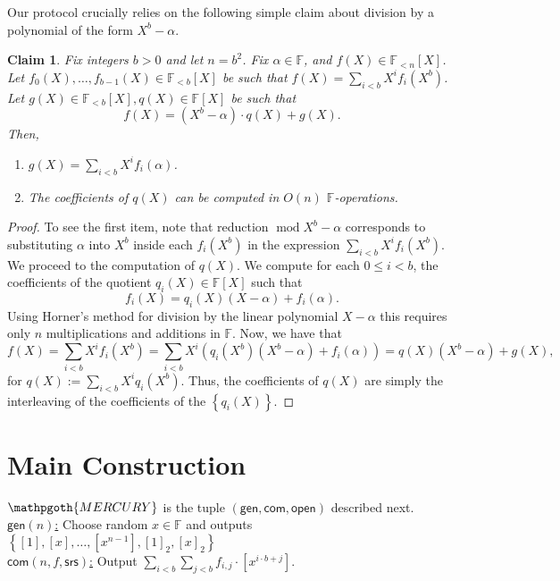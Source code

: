 \documentclass[11pt]{article} %
\newcommand{\mercury}{\ensuremath{\mathpgoth{MERCURY} }\xspace}
\newcommand{\F}{\ensuremath{\mathbb F}\xspace}
\newcommand{\srs}{\ensuremath{\mathsf{srs}}\xspace}
\newcommand{\com}{\ensuremath{\mathsf{com}}\xspace}
\newcommand{\open}{\ensuremath{\mathsf{open}}\xspace}
\newcommand{\defeq}{:=}
\renewcommand{\mod}{\ensuremath{\;\mathrm{mod}\;}}
\newcommand{\enc}[1]{\ensuremath{\left[#1\right]}\xspace}
\newcommand{\enctwo}[1]{\ensuremath{\left[#1\right]_2}\xspace}
\newcommand{\gen}{\ensuremath{\mathsf{gen}}\xspace}
\newcommand{\set}[1]{\ensuremath{\left\{#1\right\}}\xspace}
\newcommand{\polysofdeg}[1]{\ensuremath{\F_{< #1}[X]}\xspace}
\newcommand{\polys}{\ensuremath{\F[X]}\xspace}
\newcommand{\sumi}[1]{\sum_{i< #1}}
\newcommand{\sumj}[1]{\sum_{j< #1}}
\newtheorem{claim}[lemma]{Claim}
\begin{document}
Our protocol crucially relies on the following simple claim about division by a polynomial of the form
$X^b-\alpha$.
\begin{claim}\label{clm:univariatemod}
 Fix integers $b>0$ and let $n=b^2$. Fix $\alpha\in \F$, and $f(X)\in \polysofdeg{n}$.
Let $f_0(X),\ldots,f_{b-1}(X)\in \polysofdeg{b}$ be such that
$f(X)=\sumi{b}X^i f_i(X^b)$.
 Let $g(X)\in \polysofdeg{b},q(X)\in \polys$ be such that 
 \[f(X)=(X^b-\alpha)\cdot q(X) + g(X).\]
 Then,
 \begin{enumerate}
  \item $g(X)=\sumi{b} X^i f_i(\alpha)$.
  \item The coefficients of $q(X)$ can be computed in $O(n)$ \F-operations.
 \end{enumerate}

\end{claim}
\begin{proof}
To see the first item, note that reduction $\mod X^b-\alpha$ corresponds to substituting $\alpha$ into $X^b$ inside each $f_i(X^b)$ in the expression $\sumi{b}X^i f_i(X^b)$.
We proceed to the computation of $q(X)$.
 We compute for each $0\leq i <b$, the coefficients of the quotient $q_i(X)\in \polys$ such that
\[f_i(X)=q_i(X)(X-\alpha)+ f_i(\alpha).\]
 Using Horner's method for division by the linear polynomial $X-\alpha$ this requires only $n$ multiplications and additions in \F.
Now, we have that
\[f(X)=\sumi{b}X^i f_i(X^b) = \sumi{b} X^i \left(q_i(X^b)(X^b-\alpha)+f_i(\alpha)\right)= q(X)(X^b-\alpha) + g(X),\]
for $q(X)\defeq \sumi{b}X^i q_i(X^b)$.
Thus, the coefficients of $q(X)$ are simply the interleaving of the coefficients of the \set{q_i(X)}.
\end{proof}


\section{Main Construction}\label{sec:main}
\mercury is the tuple $(\gen,\com,\open)$ described next. \\    

\noindent
\underline{$\gen(n)$:}
Choose random $x\in \F$ and outputs \set{\enc{1},\enc{x},\ldots,\enc{x^{n-1}},\enctwo{1},\enctwo{x}}\\

\noindent
\underline{$\com(n,f,\srs)$:}
 Output $\sumi{b}\sumj{b}f_{i,j}\cdot \enc{x^{i\cdot b + j}}$.\\ \\ 
\end{document}
